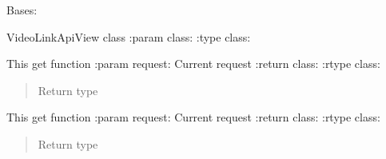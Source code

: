 \documentclass[letterpaper,10pt,english]{sphinxmanual}
\begin{document}
\begin{fulllineitems}
\label{\detokenize{vtcvlp:vtcuser.views.VideoLinkApiView}}
Bases: 

VideoLinkApiView class
:param class: 
:type class: 

\begin{fulllineitems}
\label{\detokenize{vtcvlp:vtcuser.views.VideoLinkApiView.get}}
This get function
:param request: Current request
:return class: 
:rtype class: 
\begin{quote}\begin{description}
\item[{Return type}] \leavevmode
{}

\end{description}\end{quote}

\end{fulllineitems}


\begin{fulllineitems}
\label{\detokenize{vtcvlp:vtcuser.views.VideoLinkApiView.post}}
This get function
:param request: Current request
:return class: 
:rtype class: 
\begin{quote}\begin{description}
\item[{Return type}] \leavevmode
{}

\end{description}\end{quote}

\end{fulllineitems}


\end{fulllineitems}
\end{document}
